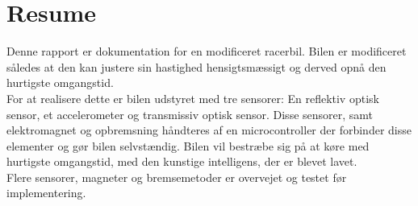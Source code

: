 \newpage
\section{Resume}
Denne rapport er dokumentation for en modificeret racerbil. Bilen er modificeret således at den kan justere sin hastighed hensigtsmæssigt og derved opnå den hurtigste omgangstid.\\
For at realisere dette er bilen udstyret med tre sensorer: En reflektiv optisk sensor, et accelerometer og transmissiv optisk sensor. Disse sensorer, samt elektromagnet og opbremsning håndteres af en microcontroller der forbinder disse elementer og gør bilen selvstændig. Bilen vil bestræbe sig på at køre med hurtigste omgangstid, med den kunstige intelligens, der er blevet lavet.\\ Flere sensorer, magneter og bremsemetoder er overvejet og testet før implementering. \\

  